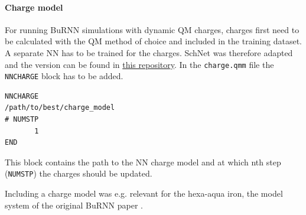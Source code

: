 \paragraph{Charge model}
For running BuRNN simulations with dynamic QM charges, charges first need to be calculated with the QM method of choice and included in the training dataset. A separate NN has to be trained for the charges. SchNet was therefore adapted and the version can be found in \href{https://github.com/juliawestermayr/schnetpack}{this repository}.
In the \texttt{charge.qmm} file the \texttt{NNCHARGE} block has to be added. 

\begin{lstlisting}[breaklines=true, breakatwhitespace=false]
NNCHARGE
/path/to/best/charge_model
# NUMSTP
       1
END
\end{lstlisting}

This block contains the path to the NN charge model and at which nth step (\texttt{NUMSTP}) the charges should be updated.

Including a charge model was e.g. relevant for the hexa-aqua iron, the model system of the original BuRNN paper \cite{Lier2022BuRNN}.

